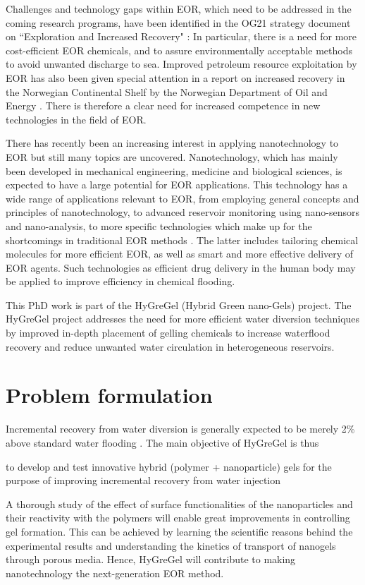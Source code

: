 Challenges and technology gaps within EOR,  which need to be addressed in the coming research programs, have been identified in the OG21 strategy document on ``Exploration and Increased Recovery" \citep{OG21}: In particular, there is a need for more cost-efficient EOR chemicals, and to assure environmentally acceptable methods to avoid unwanted discharge to sea. Improved petroleum resource exploitation by EOR has also been given special attention in a report on increased recovery in the Norwegian Continental Shelf by the Norwegian Department of Oil and Energy \citep{Am2010}. There is therefore a clear need for increased competence in new technologies in the field of EOR. 

There has recently been an increasing interest in applying nanotechnology to EOR but still many topics are uncovered. Nanotechnology,  which has mainly been developed in mechanical engineering, medicine and biological sciences, is expected to have a large potential for EOR applications. This technology has a wide range of applications relevant to EOR, from employing general concepts and principles of nanotechnology, to advanced reservoir monitoring using nano-sensors and nano-analysis, to more specific technologies which make up for the shortcomings in traditional EOR methods \citep{Fletcher2010, Ayatollahi2012, Cocuzza2011}. The latter includes tailoring chemical molecules for more efficient EOR, as well as smart and more effective delivery of EOR agents. Such technologies as efficient drug delivery in the human body may be applied to improve efficiency in chemical flooding.

This PhD work is part of the HyGreGel (Hybrid Green nano-Gels) project. The HyGreGel project addresses the need for more efficient water diversion techniques by improved in-depth placement of gelling chemicals to increase waterflood recovery and reduce unwanted water circulation in heterogeneous reservoirs.
\section{Problem formulation}

Incremental recovery from water diversion is generally expected to be merely 2\% above standard water flooding \citep{OG21}. The main objective of HyGreGel is thus 
\begin{tcolorbox}
to develop and test innovative hybrid (polymer + nanoparticle) gels for the purpose of improving incremental recovery from water injection
\end{tcolorbox}
A thorough study of the effect of surface functionalities of the nanoparticles and their reactivity with the polymers will enable great improvements in controlling gel formation. This can be achieved by learning the scientific reasons behind the experimental results and understanding the kinetics of transport of nanogels through porous media. Hence,  HyGreGel will contribute to making nanotechnology the next-generation EOR method.

